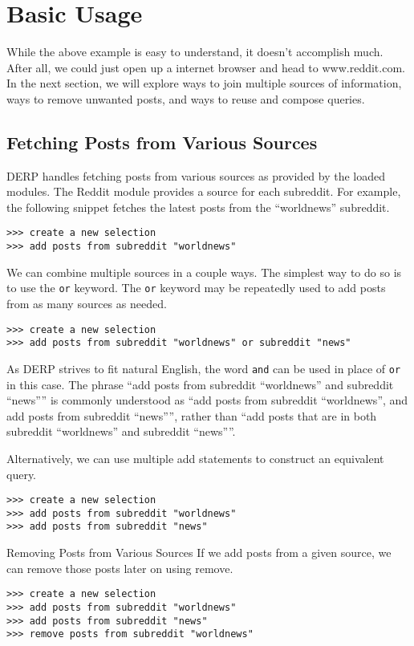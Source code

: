 \section{Basic Usage}
While the above example is easy to understand, it doesn’t accomplish much. After all, we could just open up a internet browser and head to www.reddit.com.
In the next section, we will explore ways to join multiple sources of information, ways to remove unwanted posts, and ways to reuse and compose queries.

\subsection{Fetching Posts from Various Sources}

DERP handles fetching posts from various sources as provided by the loaded modules. The Reddit module provides a source for each subreddit. For example,
the following snippet fetches the latest posts from the “worldnews” subreddit.
\newline\begin{minipage}{\linewidth}\begin{lstlisting}
>>> create a new selection
>>> add posts from subreddit "worldnews"
\end{lstlisting}\end{minipage}
We can combine multiple sources in a couple ways. The simplest way to do so is to use the \texttt{or} keyword. The \texttt{or} keyword may be repeatedly used to add posts
from as many sources as needed.
\newline\begin{minipage}{\linewidth}\begin{lstlisting}
>>> create a new selection
>>> add posts from subreddit "worldnews" or subreddit "news"
\end{lstlisting}\end{minipage}
As DERP strives to fit natural English, the word \texttt{and} can be used in place of \texttt{or} in this case. The phrase “add posts from subreddit “worldnews” and
subreddit “news”” is commonly understood as “add posts from subreddit “worldnews”, and add posts from subreddit “news””, rather than “add posts that
are in both subreddit “worldnews” and subreddit “news””.

Alternatively, we can use multiple add statements to construct an equivalent query.
\newline\begin{minipage}{\linewidth}\begin{lstlisting}
>>> create a new selection
>>> add posts from subreddit "worldnews"
>>> add posts from subreddit "news"
\end{lstlisting}\end{minipage}
Removing Posts from Various Sources
If we add posts from a given source, we can remove those posts later on using remove.
\newline\begin{minipage}{\linewidth}\begin{lstlisting}
>>> create a new selection
>>> add posts from subreddit "worldnews"
>>> add posts from subreddit "news"
>>> remove posts from subreddit "worldnews"
\end{lstlisting}\end{minipage}
